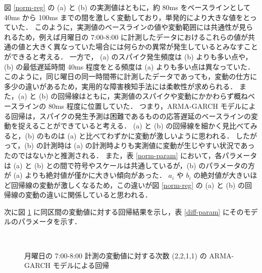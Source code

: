 \documentclass[technicalreport]{ieicej}
\begin{document}
図 \ref{norm-reg} の (a) と (b) の実測値はともに，約 80ms をベースラインとして 40ms から 100ms までの間を激しく変動しており，単発的により大きな値をとっていた．
このように，実測値のベースラインの値や変動範囲には共通性が見られるため，例えば月曜日の 7:00-8:00 に計測したデータにおけるこれらの値が共通の値と大きく異なっていた場合には何らかの異常が発生しているとみなすことができると考える．
一方で， (a) のスパイク発生頻度は (b) よりも多い点や，(b) の最低遅延時間 40ms 程度をとる頻度は (a) よりも多い点は異なっていた．
このように，同じ曜日の同一時間帯に計測したデータであっても，変動の仕方に多少の違いがあるため，実用的な障害検知手法には柔軟性が求められる．
また，(a) と (b) の回帰線はともに，実測値のスパイクや変動にかかわらず概ねベースラインの 80ms 程度に位置していた．
つまり，ARMA-GARCH モデルによる回帰は，スパイクの発生予測は困難であるものの応答遅延のベースラインの変動を捉えることができていると考える．
(a) と (b) の回帰線を細かく見比べてみると，(b) のものは (a) と比べてわずかに変動が激しいように思われる．
したがって，(b) の計測時は (a) の計測時よりも実測値に変動が生じやすい状況であったのではないかと推測される．
また，表 \ref{norm-param} において，各パラメータは (a) と (b) との間で符号やスケールは共通しているが，(b) のパラメータの方が (a) よりも絶対値が僅かに大きい傾向があった．
$a_i$ や $b_i$ の絶対値が大きいほど回帰線の変動が激しくなるため，この違いが図 \ref{norm-reg} の (a) と (b) の回帰線の変動の違いに関係していると思われる．

次に図 \ref{diff-reg} に同区間の変動値に対する回帰結果を示し，表 \ref{diff-param} にそのモデルのパラメータを示す．

\begin{figure}[tb]
\begin{center}
~
\caption{月曜日の 7:00-8:00 計測の変動値に対する次数 (2,2,1,1) の ARMA-GARCH モデルによる回帰}
\label{diff-reg}
\end{center}
\end{figure}
\end{document}
